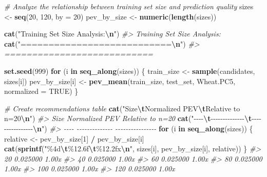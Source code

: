 \documentclass[
]{article}
\newenvironment{Shaded}{\begin{snugshade}}{\end{snugshade}}
\newcommand{\AttributeTok}[1]{\textcolor[rgb]{0.13,0.29,0.53}{#1}}
\newcommand{\CommentTok}[1]{\textcolor[rgb]{0.56,0.35,0.01}{\textit{#1}}}
\newcommand{\ConstantTok}[1]{\textcolor[rgb]{0.56,0.35,0.01}{#1}}
\newcommand{\ControlFlowTok}[1]{\textcolor[rgb]{0.13,0.29,0.53}{\textbf{#1}}}
\newcommand{\DecValTok}[1]{\textcolor[rgb]{0.00,0.00,0.81}{#1}}
\newcommand{\FunctionTok}[1]{\textcolor[rgb]{0.13,0.29,0.53}{\textbf{#1}}}
\newcommand{\NormalTok}[1]{#1}
\newcommand{\OtherTok}[1]{\textcolor[rgb]{0.56,0.35,0.01}{#1}}
\newcommand{\SpecialCharTok}[1]{\textcolor[rgb]{0.81,0.36,0.00}{\textbf{#1}}}
\newcommand{\StringTok}[1]{\textcolor[rgb]{0.31,0.60,0.02}{#1}}
\begin{document}
\begin{Shaded}
\begin{Highlighting}[]
\CommentTok{\# Analyze the relationship between training set size and prediction quality}
\NormalTok{sizes }\OtherTok{\textless{}{-}} \FunctionTok{seq}\NormalTok{(}\DecValTok{20}\NormalTok{, }\DecValTok{120}\NormalTok{, }\AttributeTok{by =} \DecValTok{20}\NormalTok{)}
\NormalTok{pev\_by\_size }\OtherTok{\textless{}{-}} \FunctionTok{numeric}\NormalTok{(}\FunctionTok{length}\NormalTok{(sizes))}

\FunctionTok{cat}\NormalTok{(}\StringTok{"Training Set Size Analysis:}\SpecialCharTok{\textbackslash{}n}\StringTok{"}\NormalTok{)}
\CommentTok{\#\textgreater{} Training Set Size Analysis:}
\FunctionTok{cat}\NormalTok{(}\StringTok{"===========================}\SpecialCharTok{\textbackslash{}n}\StringTok{"}\NormalTok{)}
\CommentTok{\#\textgreater{} ===========================}

\FunctionTok{set.seed}\NormalTok{(}\DecValTok{999}\NormalTok{)}
\ControlFlowTok{for}\NormalTok{ (i }\ControlFlowTok{in} \FunctionTok{seq\_along}\NormalTok{(sizes)) \{}
\NormalTok{  train\_size }\OtherTok{\textless{}{-}} \FunctionTok{sample}\NormalTok{(candidates, sizes[i])}
\NormalTok{  pev\_by\_size[i] }\OtherTok{\textless{}{-}} \FunctionTok{pev\_mean}\NormalTok{(train\_size, test\_set, Wheat.PC5, }\AttributeTok{normalized =} \ConstantTok{TRUE}\NormalTok{)}
\NormalTok{\}}

\CommentTok{\# Create recommendations table}
\FunctionTok{cat}\NormalTok{(}\StringTok{"Size}\SpecialCharTok{\textbackslash{}t}\StringTok{Normalized PEV}\SpecialCharTok{\textbackslash{}t}\StringTok{Relative to n=20}\SpecialCharTok{\textbackslash{}n}\StringTok{"}\NormalTok{)}
\CommentTok{\#\textgreater{} Size Normalized PEV  Relative to n=20}
\FunctionTok{cat}\NormalTok{(}\StringTok{"{-}{-}{-}{-}}\SpecialCharTok{\textbackslash{}t}\StringTok{{-}{-}{-}{-}{-}{-}{-}{-}{-}{-}{-}{-}{-}{-}}\SpecialCharTok{\textbackslash{}t}\StringTok{{-}{-}{-}{-}{-}{-}{-}{-}{-}{-}{-}{-}{-}{-}{-}{-}}\SpecialCharTok{\textbackslash{}n}\StringTok{"}\NormalTok{)}
\CommentTok{\#\textgreater{} {-}{-}{-}{-} {-}{-}{-}{-}{-}{-}{-}{-}{-}{-}{-}{-}{-}{-}  {-}{-}{-}{-}{-}{-}{-}{-}{-}{-}{-}{-}{-}{-}{-}{-}}
\ControlFlowTok{for}\NormalTok{ (i }\ControlFlowTok{in} \FunctionTok{seq\_along}\NormalTok{(sizes)) \{}
\NormalTok{  relative }\OtherTok{\textless{}{-}}\NormalTok{ pev\_by\_size[}\DecValTok{1}\NormalTok{] }\SpecialCharTok{/}\NormalTok{ pev\_by\_size[i]}
  \FunctionTok{cat}\NormalTok{(}\FunctionTok{sprintf}\NormalTok{(}\StringTok{"\%4d}\SpecialCharTok{\textbackslash{}t}\StringTok{\%12.6f}\SpecialCharTok{\textbackslash{}t}\StringTok{\%12.2fx}\SpecialCharTok{\textbackslash{}n}\StringTok{"}\NormalTok{, sizes[i], pev\_by\_size[i], relative))}
\NormalTok{\}}
\CommentTok{\#\textgreater{}   20     0.025000            1.00x}
\CommentTok{\#\textgreater{}   40     0.025000            1.00x}
\CommentTok{\#\textgreater{}   60     0.025000            1.00x}
\CommentTok{\#\textgreater{}   80     0.025000            1.00x}
\CommentTok{\#\textgreater{}  100     0.025000            1.00x}
\CommentTok{\#\textgreater{}  120     0.025000            1.00x}
\end{Highlighting}
\end{Shaded}
\end{document}
